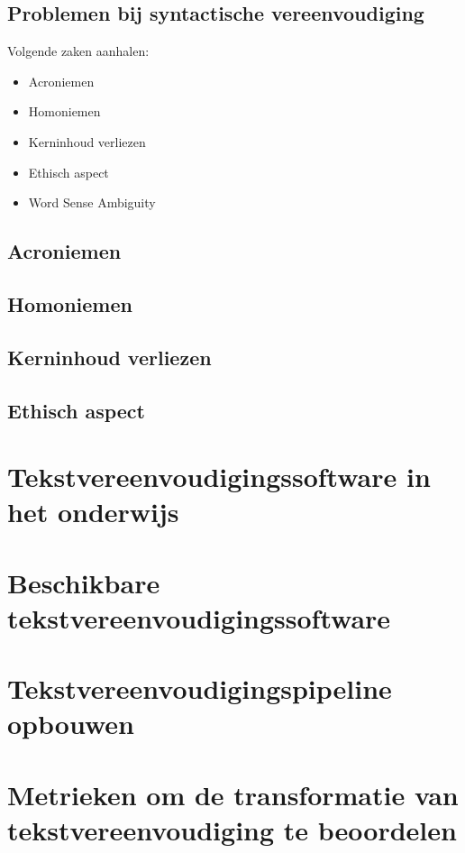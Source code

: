 \subsection{Problemen bij syntactische vereenvoudiging}

Volgende zaken aanhalen:
\begin{itemize}
	\item Acroniemen
	\item Homoniemen
	\item Kerninhoud verliezen
	\item Ethisch aspect
	\item Word Sense Ambiguity
\end{itemize}

\subsection{Acroniemen}

\subsection{Homoniemen}

\subsection{Kerninhoud verliezen}

\subsection{Ethisch aspect}



\cite{Gooding2022}

\section{Tekstvereenvoudigingssoftware in het onderwijs}

\section{Beschikbare tekstvereenvoudigingssoftware}

\section{Tekstvereenvoudigingspipeline opbouwen}

\section{Metrieken om de transformatie van tekstvereenvoudiging te beoordelen}

